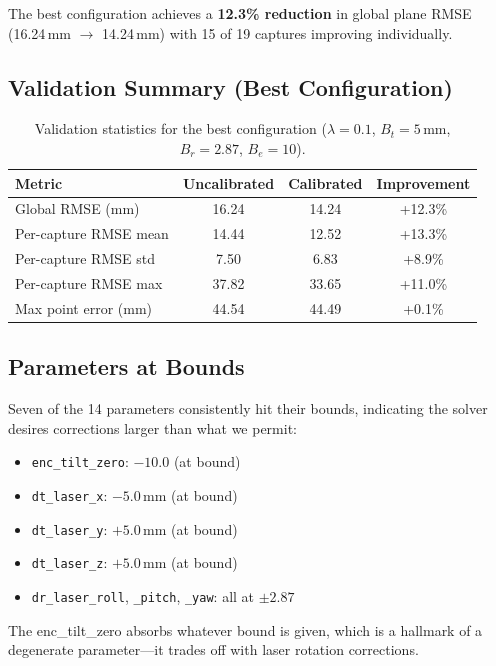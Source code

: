 \documentclass[12pt,a4paper]{article}
\newcommand{\code}[1]{\texttt{#1}}
\begin{document}
The best configuration achieves a \textbf{12.3\% reduction} in global
plane RMSE (16.24\,mm $\to$ 14.24\,mm) with 15 of 19 captures improving
individually.

\subsection{Validation Summary (Best Configuration)}

\begin{table}[H]
\centering
\caption{Validation statistics for the best configuration
($\lambda = 0.1$, $B_t = 5$\,mm, $B_r = 2.87$\textdegree,
$B_e = 10$\textdegree).}
\label{tab:validation}
\begin{tabular}{@{}lccc@{}}
\toprule
Metric & Uncalibrated & Calibrated & Improvement \\
\midrule
Global RMSE (mm)       & 16.24 & 14.24 & +12.3\% \\
Per-capture RMSE mean  & 14.44 & 12.52 & +13.3\% \\
Per-capture RMSE std   &  7.50 &  6.83 & +8.9\%  \\
Per-capture RMSE max   & 37.82 & 33.65 & +11.0\% \\
Max point error (mm)   & 44.54 & 44.49 & +0.1\%  \\
\bottomrule
\end{tabular}
\end{table}

\subsection{Parameters at Bounds}

Seven of the 14 parameters consistently hit their bounds, indicating
the solver desires corrections larger than what we permit:
\begin{itemize}[nosep]
    \item \code{enc\_tilt\_zero}: $-10.0$\textdegree{} (at bound)
    \item \code{dt\_laser\_x}: $-5.0$\,mm (at bound)
    \item \code{dt\_laser\_y}: $+5.0$\,mm (at bound)
    \item \code{dt\_laser\_z}: $+5.0$\,mm (at bound)
    \item \code{dr\_laser\_roll}, \code{\_pitch}, \code{\_yaw}: all at $\pm 2.87$\textdegree{}
\end{itemize}

The enc\_tilt\_zero absorbs whatever bound is given, which is a hallmark of
a degenerate parameter---it trades off with laser rotation corrections.
\end{document}
